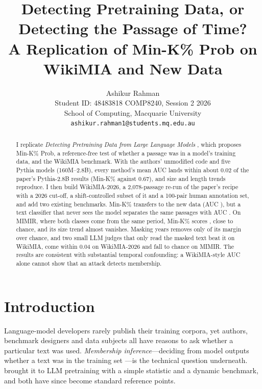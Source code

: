 \documentclass[11pt]{article}
\title{Detecting Pretraining Data, or Detecting the Passage of Time?\\
A Replication of Min-K\% Prob on WikiMIA and New Data}
\author{Ashikur Rahman \\
  Student ID: 48483818 \quad
  COMP8240, Session 2 2026 \\
  School of Computing, Macquarie University \\
  \texttt{ashikur.rahman1@students.mq.edu.au}}
\begin{document}
\maketitle

\begin{abstract}
I replicate \emph{Detecting Pretraining Data from Large Language Models} \citep{shi2024detecting}, which proposes Min-K\% Prob, a reference-free test of whether a passage was in a model's training data, and the WikiMIA benchmark. With the authors' unmodified code and five Pythia models (160M--2.8B), every method's mean AUC lands within about 0.02 of the paper's Pythia-2.8B results (Min-K\% \RepMinK{} against 0.67), and size and length trends reproduce. I then build WikiMIA-2026, a 2,078-passage re-run of the paper's recipe with a 2026 cut-off, a shift-controlled subset of it and a 100-pair human annotation set, and add two existing benchmarks. Min-K\% transfers to the new data (AUC \NewMinK{}), but a text classifier that never sees the model separates the same passages with AUC \BlindNewRaw{}. On MIMIR, where both classes come from the same period, Min-K\% scores \MimirMinK{}, close to chance, and its size trend almost vanishes. Masking years removes only \MaskShareRange{} of its margin over chance, and two small LLM judges that only read the masked text beat it on WikiMIA, come within 0.04 on WikiMIA-2026 and fall to chance on MIMIR. The results are consistent with substantial temporal confounding: a WikiMIA-style AUC alone cannot show that an attack detects membership.
\end{abstract}

\section{Introduction}

Language-model developers rarely publish their training corpora, yet authors, benchmark designers and data subjects all have reasons to ask whether a particular text was used. \emph{Membership inference}---deciding from model outputs whether a text was in the training set \citep{shokri2017membership}---is the technical question underneath. \citet{shi2024detecting} brought it to LLM pretraining with a simple statistic and a dynamic benchmark, and both have since become standard reference points.
\end{document}
